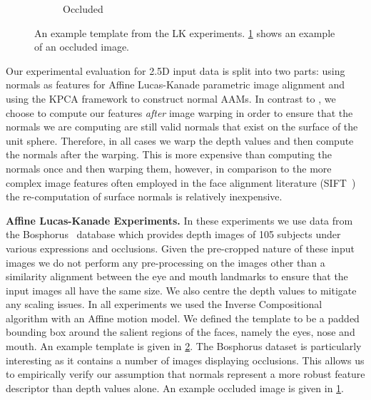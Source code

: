 \begin{figure}[t]
\begin{subfigure}[b]{0.2\textwidth}
        \caption{Occluded}\label{subfig:singl_img_depth_2d_lk_template_occluded}
    \end{subfigure}
    \hspace*{\fill}
    \caption{An example template from the LK experiments.
             \cref{subfig:singl_img_depth_2d_lk_template_occluded} shows an
             example of an occluded image.}
\label{fig:single_img_2d_lk_examples}
\end{figure}
Our experimental evaluation for 2.5D input data is split into two parts: using
normals as features for Affine Lucas-Kanade parametric image alignment and
using the KPCA framework to construct normal AAMs. In contrast to
\citet{antonakos2015feature}, we choose to compute our features \textit{after}
image warping in order to ensure that the normals we are computing are still
valid normals that exist on the surface of the unit sphere. Therefore, in all
cases we warp the depth values and then compute the normals after the
warping. This is more expensive than computing the normals once and then
warping them, however, in comparison to the more complex image features
often employed in the face alignment literature
(\eg SIFT~\cite{lowe2004distinctive}) the re-computation of surface normals
is relatively inexpensive.

\textbf{Affine Lucas-Kanade Experiments.} In these experiments we use data
from the Bosphorus~\cite{Savran:2008gg} database which provides depth images
of 105 subjects under various expressions and occlusions. Given the pre-cropped
nature of these input images we do not perform any pre-processing on the
images other than a similarity alignment between the eye and mouth landmarks to
ensure that the input images all have the same size. We also centre the depth
values to mitigate any scaling issues. In all experiments we used the
Inverse Compositional algorithm with an Affine motion model.
We defined the template to be a padded
bounding box around the salient regions of the faces, namely the eyes, nose and
mouth. An example template is given in \cref{fig:single_img_2d_lk_examples}.
The Bosphorus dataset is particularly interesting as it contains a number of
images displaying occlusions. This allows us to empirically verify our assumption
that normals represent a more robust feature descriptor than depth values alone.
An example occluded image is given in
\cref{subfig:singl_img_depth_2d_lk_template_occluded}.

